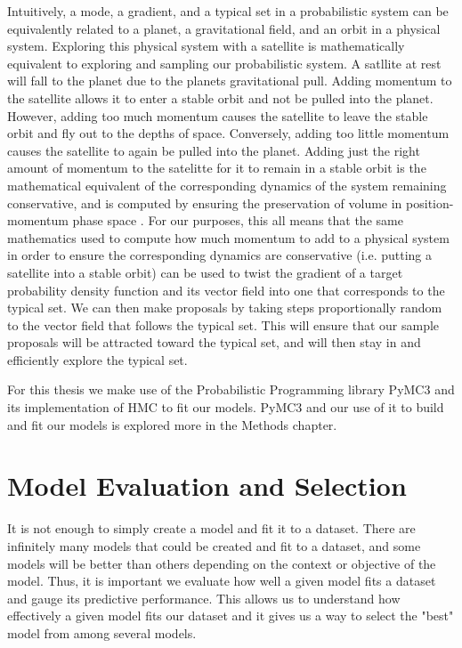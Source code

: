 Intuitively, a mode, a gradient, and a typical set in a probabilistic system can be equivalently related to a planet, a gravitational field, and an orbit in a physical system. Exploring this physical system with a satellite is mathematically equivalent to exploring and sampling our probabilistic system. A satllite at rest will fall to the planet due to the planets gravitational pull. Adding momentum to the satellite allows it to enter a stable orbit and not be pulled into the planet. However, adding too much momentum causes the satellite to leave the stable orbit and fly out to the depths of space. Conversely, adding too little momentum causes the satellite to again be pulled into the planet. Adding just the right amount of momentum to the satelitte for it to remain in a stable orbit is the mathematical equivalent of the corresponding dynamics of the system remaining conservative, and is computed by ensuring the preservation of volume in position-momentum phase space \cite{Betancourt2017}. For our purposes, this all means that the same mathematics used to compute how much momentum to add to a physical system in order to ensure the corresponding dynamics are conservative (i.e. putting a satellite into a stable orbit) can be used to twist the gradient of a target probability density function and its vector field into one that corresponds to the typical set. We can then make proposals by taking steps proportionally random to the vector field that follows the typical set. This will ensure that our sample proposals will be attracted toward the typical set, and will then stay in and efficiently explore the typical set.

For this thesis we make use of the Probabilistic Programming library PyMC3 \cite{pymc3} and its implementation of HMC to fit our models. PyMC3 and our use of it to build and fit our models is explored more in the Methods chapter.

\section{Model Evaluation and Selection}

It is not enough to simply create a model and fit it to a dataset. There are infinitely many models that could be created and fit to a dataset, and some models will be better than others depending on the context or objective of the model. Thus, it is important we evaluate how well a given model fits a dataset and gauge its predictive performance. This allows us to understand how effectively a given model fits our dataset and it gives us a way to select the "best" model from among several models.

